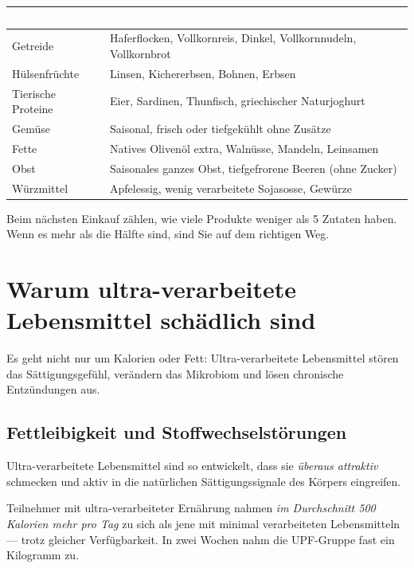 \documentclass[a5paper,12pt,oneside,openany]{book}
\newcommand{\boxgruen}[2]{%
  \begin{tcolorbox}[kastenbase,
    colback=verdescuro!8!white, colframe=verdescuro, title={#1}]
  #2\end{tcolorbox}}
\newcommand{\boxinfo}[2]{%
  \begin{tcolorbox}[kastenbase,
    colback=blauinfo!8!white, colframe=blauinfo, title={#1}]
  #2\end{tcolorbox}}
\begin{document}
{\small
\begin{tabularx}{\textwidth}{|l|L|}
\hline
{}
  \textcolor{white}{\textbf{Kategorie}}
  & \textcolor{white}{\textbf{Empfohlene Produkte}} \\
\hline
Getreide & Haferflocken, Vollkornreis, Dinkel, Vollkornnudeln, Vollkornbrot \\
\hline
H\"{u}lsenfr\"{u}chte & Linsen, Kichererbsen, Bohnen, Erbsen \\
\hline
Tierische Proteine & Eier, Sardinen, Thunfisch, griechischer Naturjoghurt \\
\hline
Gem\"{u}se & Saisonal, frisch oder tiefgek\"{u}hlt ohne Zus\"{a}tze \\
\hline
Fette & Natives Oliven\"{o}l extra, Waln\"{u}sse, Mandeln, Leinsamen \\
\hline
Obst & Saisonales ganzes Obst, tiefgefrorene Beeren (ohne Zucker) \\
\hline
W\"{u}rzmittel & Apfelessig, wenig verarbeitete Sojasosse, Gew\"{u}rze \\
\hline
\end{tabularx}
}

\boxgruen{Der Warenkorb-Test}{Beim n\"{a}chsten Einkauf z\"{a}hlen, wie viele
Produkte weniger als 5 Zutaten haben. Wenn es mehr als die H\"{a}lfte sind,
sind Sie auf dem richtigen Weg.}

\chapter{Warum ultra-verarbeitete Lebensmittel sch\"{a}dlich sind}

Es geht nicht nur um Kalorien oder Fett: Ultra-verarbeitete Lebensmittel
st\"{o}ren das S\"{a}ttigungsgef\"{u}hl, ver\"{a}ndern das Mikrobiom und
l\"{o}sen chronische Entz\"{u}ndungen aus.

\section{Fettleibigkeit und Stoffwechselst\"{o}rungen}

Ultra-verarbeitete Lebensmittel sind so entwickelt, dass sie \emph{\"{u}beraus
attraktiv} schmecken und aktiv in die nat\"{u}rlichen S\"{a}ttigungssignale
des K\"{o}rpers eingreifen.

\boxinfo{Kevin Hall Studie (NIH, 2019)}{Teilnehmer mit ultra-verarbeiteter
Ern\"{a}hrung nahmen \emph{im Durchschnitt 500 Kalorien mehr pro Tag} zu sich
als jene mit minimal verarbeiteten Lebensmitteln --- trotz gleicher
Verf\"{u}gbarkeit. In zwei Wochen nahm die UPF-Gruppe fast ein Kilogramm zu.}
\end{document}
